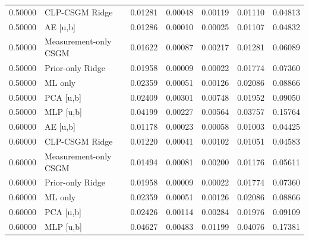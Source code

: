 \begin{tabular}{rlrrrrr}
0.50000 & CLP-CSGM Ridge & 0.01281 & 0.00048 & 0.00119 & 0.01110 & 0.04813 \\
0.50000 & AE [u,b] & 0.01286 & 0.00010 & 0.00025 & 0.01107 & 0.04832 \\
0.50000 & Measurement-only CSGM & 0.01622 & 0.00087 & 0.00217 & 0.01281 & 0.06089 \\
0.50000 & Prior-only Ridge & 0.01958 & 0.00009 & 0.00022 & 0.01774 & 0.07360 \\
0.50000 & ML only & 0.02359 & 0.00051 & 0.00126 & 0.02086 & 0.08866 \\
0.50000 & PCA [u,b] & 0.02409 & 0.00301 & 0.00748 & 0.01952 & 0.09050 \\
0.50000 & MLP [u,b] & 0.04199 & 0.00227 & 0.00564 & 0.03757 & 0.15764 \\
0.60000 & AE [u,b] & 0.01178 & 0.00023 & 0.00058 & 0.01003 & 0.04425 \\
0.60000 & CLP-CSGM Ridge & 0.01220 & 0.00041 & 0.00102 & 0.01051 & 0.04583 \\
0.60000 & Measurement-only CSGM & 0.01494 & 0.00081 & 0.00200 & 0.01176 & 0.05611 \\
0.60000 & Prior-only Ridge & 0.01958 & 0.00009 & 0.00022 & 0.01774 & 0.07360 \\
0.60000 & ML only & 0.02359 & 0.00051 & 0.00126 & 0.02086 & 0.08866 \\
0.60000 & PCA [u,b] & 0.02426 & 0.00114 & 0.00284 & 0.01976 & 0.09109 \\
0.60000 & MLP [u,b] & 0.04627 & 0.00483 & 0.01199 & 0.04076 & 0.17381 \\
\bottomrule
\end{tabular}
